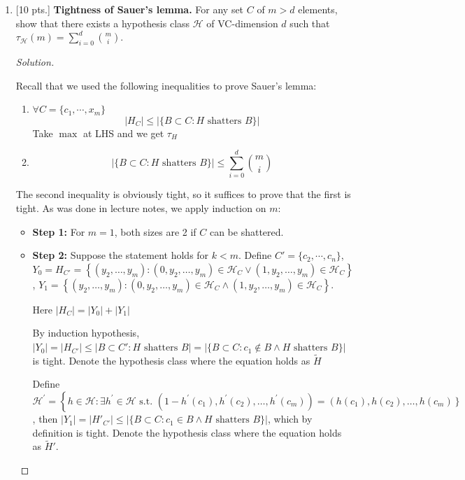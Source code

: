 \documentclass[12pt,letterpaper]{article}
\newenvironment{solution}{%
  \begin{proof}[Solution]$ $\par\nobreak\ignorespaces
}{%
  \end{proof}
}
\begin{document}
\begin{enumerate}
\item {[10 pts.]}
{\bf Tightness of Sauer's lemma.} For any set $C$ of $m > d$ elements, show that there exists a hypothesis class $\mathcal{H}$ of VC-dimension $d$ such that $\tau_{\mathcal{H}}(m)=\sum_{i=0}^{d}\binom{m}{i}$.
\begin{solution}
  Recall that we used the following inequalities to prove Sauer's lemma:
  \begin{enumerate}
  \item $\forall C=\{c_{1},\cdots,x_{m}\}$
    \[|H_{C}|\leq |\{B\subset C: H \text{ shatters } B\}|\]
    Take $\max$ at LHS and we get $\tau_{H}$
  \item \[|\{B\subset C: H \text{ shatters } B\}|\leq \sum_{i=0}^{d}\binom{m}{i}\]
  \end{enumerate}
  The second inequality is obviously tight, so it suffices to prove that the first is tight. As was done in lecture notes, we apply induction on $m$:
  \begin{itemize}
  \item \textbf{Step 1: } For $m=1$, both sizes are 2 if $C$ can be shattered.
  \item \textbf{Step 2: } Suppose the statement holds for $k<m$. Define $C'=\{c_{2},\cdots, c_{n}\}$, $Y_{0}=H_{C'}=\left\{\left(y_{2}, \ldots, y_{m}\right):\left(0, y_{2}, \ldots, y_{m}\right) \in \mathcal{H}_{C} \vee\left(1, y_{2}, \ldots, y_{m}\right) \in \mathcal{H}_{C}\right\}$, $Y_{1}=\left\{\left(y_{2}, \ldots, y_{m}\right):\left(0, y_{2}, \ldots, y_{m}\right) \in \mathcal{H}_{C} \land\left(1, y_{2}, \ldots, y_{m}\right) \in \mathcal{H}_{C}\right\}$.

    Here $|H_{C}|=|Y_{0}|+|Y_{1}|$
    
    By induction hypothesis, $|Y_{0}|=|H_{C'}|\leq |B\subset C': H \text{ shatters } B|=|\{B\subset C: c_{1}\not\in B\land H \text{ shatters }B\}|$ is tight. Denote the hypothesis class where the equation holds as $\tilde{H}$

    Define $\mathcal{H}^{\prime} =\left\{h \in \mathcal{H}: \exists h^{\prime} \in \mathcal{H} \text { s.t. }\left(1-h^{\prime}\left(c_{1}\right), h^{\prime}\left(c_{2}\right), \ldots, h^{\prime}\left(c_{m}\right)\right)\right.=\left(h\left(c_{1}\right), h\left(c_{2}\right), \ldots, h\left(c_{m}\right)\right\}$, then $|Y_{1}|=|H'_{C'}|\leq |\{B\subset C: c_{1}\in B\land H\text{ shatters } B\}|$, which by definition is tight. Denote the hypothesis class where the equation holds as $\tilde{H}'$.


\end{itemize}
\end{solution}
\end{enumerate}
\end{document}
